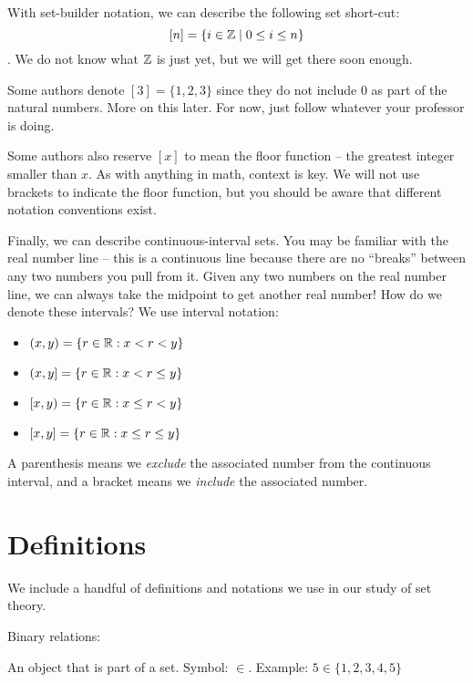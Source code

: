 \documentclass[main.tex]{subfiles}
\begin{document}

With set-builder notation, we can describe the following set short-cut: \[[n] = \{i \in \mathbb{Z} \mid 0 \leq i \leq n\}\].
We do not know what \(\mathbb{Z}\) is just yet, but we will get there soon enough.

\begin{rem}
	Some authors denote \([3] = \{1,2,3\}\) since they do not include 0 as part of the natural numbers. More on this later. For now, just follow whatever your professor is doing.
\end{rem}

\begin{rem}
	Some authors also reserve \([x]\) to mean the floor function -- the greatest integer smaller than \(x\). As with anything in math, context is key. We will not use brackets to indicate the floor function, but you should be aware that different notation conventions exist.
\end{rem}

Finally, we can describe continuous-interval sets. You may be familiar with the real number line -- this is a continuous line because there are no ``breaks'' between any two numbers you pull from it. Given any two numbers on the real number line, we can always take the midpoint to get another real number! How do we denote these intervals? We use interval notation:
\begin{itemize}
	\item \((x,y) = \{r \in \mathbb{R} : x < r < y\}\)
	\item \((x,y] = \{r \in \mathbb{R} : x < r \leq y\}\)
	\item \([x,y) = \{r \in \mathbb{R} : x \leq r < y\}\)
	\item \([x,y] = \{r \in \mathbb{R} : x \leq r \leq y\}\)
\end{itemize}

A parenthesis means we \textit{exclude} the associated number from the continuous interval, and a bracket means we \textit{include} the associated number.

\section{Definitions}

We include a handful of definitions and notations we use in our study of set theory.

Binary relations:

\begin{defn}
	An object that is part of a set. Symbol: \(\in\). Example: \(5 \in \{1,2,3,4,5\}\)
\end{defn}
\end{document}
